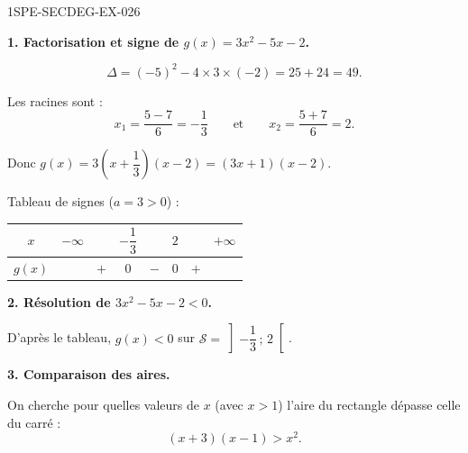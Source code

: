 \begin{corrige}{1SPE-SECDEG-EX-026}

\textbf{1. Factorisation et signe de $g(x) = 3x^2 - 5x - 2$.}


\[\Delta = (-5)^2 - 4 \times 3 \times (-2) = 25 + 24 = 49.\]

Les racines sont :
\[x_1 = \frac{5 - 7}{6} = -\frac{1}{3} \qquad \text{et} \qquad x_2 = \frac{5 + 7}{6} = 2.\]

Donc $g(x) = 3\!\left(x + \dfrac{1}{3}\right)\!(x - 2) = (3x + 1)(x - 2)$.

Tableau de signes ($a = 3 > 0$) :

\medskip
\begin{center}
\begin{tabular}{|c|ccccccc|}
\hline
$x$ & $-\infty$ & & $-\dfrac{1}{3}$ & & $2$ & & $+\infty$ \\
\hline
$g(x)$ & & $+$ & $0$ & $-$ & $0$ & $+$ & \\
\hline
\end{tabular}
\end{center}

\medskip
\textbf{2. Résolution de $3x^2 - 5x - 2 < 0$.}


D'après le tableau, $g(x) < 0$ sur $\mathcal{S} = \left]-\dfrac{1}{3}\,;\,2\right[$.

\medskip
\textbf{3. Comparaison des aires.}


On cherche pour quelles valeurs de $x$ (avec $x > 1$) l'aire du rectangle dépasse celle du carré :
\[(x+3)(x-1) > x^2.\]


\end{corrige}
